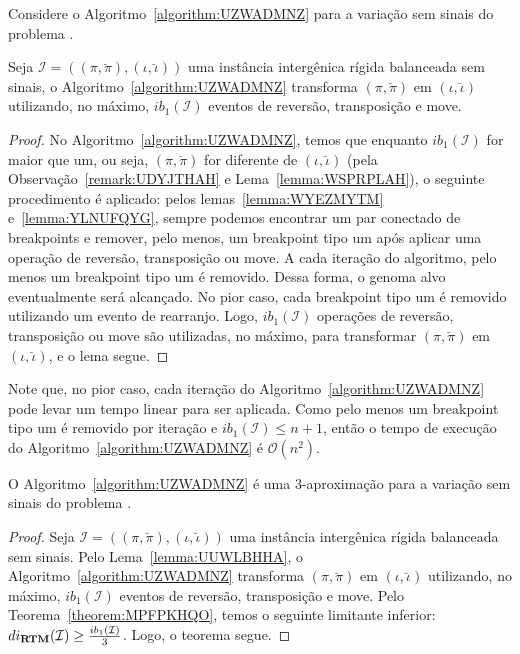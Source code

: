 Considere o Algoritmo~\ref{algorithm:UZWADMNZ} para a variação sem sinais do problema \SbIRTM{}.



\begin{lemma}\label{lemma:UUWLBHHA}
Seja $\mathcal{I} = ((\pi,\breve\pi),(\iota,\breve\iota))$ uma instância intergênica rígida balanceada sem sinais, o Algoritmo~\ref{algorithm:UZWADMNZ} transforma $(\pi,\breve\pi)$ em $(\iota,\breve\iota)$ utilizando, no máximo, $ib_1(\mathcal{I})$ eventos de reversão, transposição e move.
\end{lemma}
\begin{proof}
No Algoritmo~\ref{algorithm:UZWADMNZ}, temos que enquanto $ib_1(\mathcal{I})$ for maior que um, ou seja, $(\pi,\breve\pi)$ for diferente de $(\iota,\breve\iota)$ (pela Observação~\ref{remark:UDYJTHAH} e Lema~\ref{lemma:WSPRPLAH}), o seguinte procedimento é aplicado: pelos lemas~\ref{lemma:WYEZMYTM} e~\ref{lemma:YLNUFQYG}, sempre podemos encontrar um par conectado de breakpoints e remover, pelo menos, um breakpoint tipo um após aplicar uma operação de reversão, transposição ou move. A cada iteração do algoritmo, pelo menos um breakpoint tipo um é removido. Dessa forma, o genoma alvo eventualmente será alcançado. No pior caso, cada breakpoint tipo um é removido utilizando um evento de rearranjo. Logo, $ib_1(\mathcal{I})$ operações de reversão, transposição ou move são utilizadas, no máximo, para transformar $(\pi,\breve\pi)$ em $(\iota,\breve\iota)$, e o lema segue.
\end{proof}

Note que, no pior caso, cada iteração do Algoritmo~\ref{algorithm:UZWADMNZ} pode levar um tempo linear para ser aplicada. Como pelo menos um breakpoint tipo um é removido por iteração e $ib_1(\mathcal{I}) \le {n+1}$, então o tempo de execução do Algoritmo~\ref{algorithm:UZWADMNZ} é $\mathcal{O}(n^2)$.  

\begin{theorem}\label{theorem:EANLWIUO}
O Algoritmo~\ref{algorithm:UZWADMNZ} é uma $3$-aproximação para a variação sem sinais do problema \SbIRTM{}.
\end{theorem}
\begin{proof}
Seja $\mathcal{I} = ((\pi,\breve\pi),(\iota,\breve\iota))$ uma instância intergênica rígida balanceada sem sinais. Pelo Lema~\ref{lemma:UUWLBHHA}, o Algoritmo~\ref{algorithm:UZWADMNZ} transforma $(\pi,\breve\pi)$ em $(\iota,\breve\iota)$ utilizando, no máximo, $ib_1(\mathcal{I})$ eventos de reversão, transposição e move. Pelo Teorema~\ref{theorem:MPFPKHQO}, temos o seguinte limitante inferior: $di_{\textbf{RTM}}(\mathcal{I}) \ge \frac{ib_1(\mathcal{I})}{3}$. Logo, o teorema segue. 
\end{proof}

